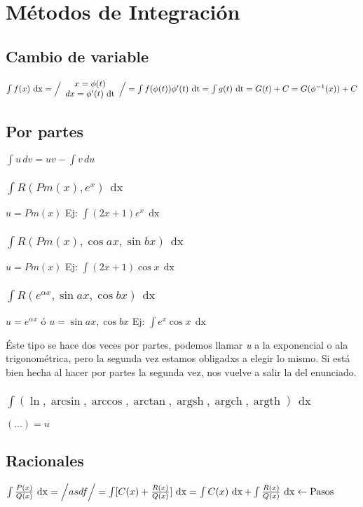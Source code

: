 \documentclass[8pt]{article}
\DeclareMathOperator{\xder}{\, \mathrm{d}x}
\DeclareMathOperator{\tder}{\, \mathrm{d}t}
\DeclareMathOperator{\argsh}{argsh}
\DeclareMathOperator{\argch}{argch}
\DeclareMathOperator{\argth}{argth}
\begin{document}
	\section{Métodos de Integración}
		\subsection{Cambio de variable}
			$ \int f(x) \xder = \Big{/}
				\begin{array}{c}
					x = \phi (t) \\
					dx = \phi'(t) \tder
				\end{array}
				\Big{/}
				= \int f(\phi(t)) \phi' (t) \tder =
				\int g(t) \tder = G (t) + C = G (\phi^{-1} (x)) + C
			$
		\subsection{Por partes}
			$ \int u \, dv = uv - \int v \, du $

			\subsubsection{$ \int R (Pm(x), e^x) \xder$}
				$ u = Pm(x) $ \quad 
				Ej: $ \int (2x + 1) e^x \xder $
			\subsubsection{$ \int R (Pm(x), \cos ax, \sin bx) \xder $}
				$ u = Pm(x) $ \quad
				Ej: $ \int (2x + 1) \cos x \xder $
			\subsubsection{$ \int R (e^{\alpha x}, \sin ax, \cos bx) \xder $}
				$ u = e^{\alpha x} $ ó $ u = \sin ax, \cos bx $ \quad
				Ej: $ \int e^x \cos x \xder $

				Éste tipo se hace dos veces por partes, podemos llamar 
				\textit{u} a la exponencial o ala trigonométrica, pero la
				segunda vez estamos obligadxs a elegir lo mismo. Si está bien
				hecha al hacer por partes la segunda vez, nos vuelve a salir
				la del enunciado.
			\subsubsection{$ \int (\ln, \arcsin, \arccos, \arctan, \argsh, \argch, \argth ) \xder $}
				$ ( \dots ) = u $
		\subsection{Racionales}
			$ \int \frac{P(x)}{Q(x)} \xder =
				\Big{/}
					asdf
				\Big{/}
				= \int [ C(x) + \frac{R(x)}{Q(x)} ] \xder =
				\int C(x) \xder + \int \frac{R(x)}{Q(x)} \xder \leftarrow \text{Pasos} $
\end{document}
